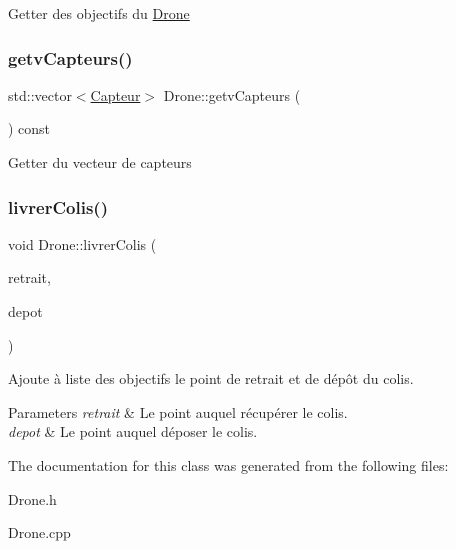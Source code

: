 Getter des objectifs du \mbox{\hyperlink{class_drone}{Drone}} \mbox{\label{class_drone_a584920a6f64ab0514f835354755af0ab}} 
\subsubsection{\texorpdfstring{getv\+Capteurs()}{getvCapteurs()}}
{\footnotesize\ttfamily std\+::vector$<$\mbox{\hyperlink{class_capteur}{Capteur}}$>$ Drone\+::getv\+Capteurs (\begin{DoxyParamCaption}{ }\end{DoxyParamCaption}) const}

Getter du vecteur de capteurs \mbox{\label{class_drone_ae7249a3f0c054e2c1beb6ea522774029}} 
\subsubsection{\texorpdfstring{livrer\+Colis()}{livrerColis()}}
{\footnotesize\ttfamily void Drone\+::livrer\+Colis (\begin{DoxyParamCaption}\item[{const \mbox{\hyperlink{class_vecteur_r3}{Vecteur\+R3}} \&}]{retrait,  }\item[{const \mbox{\hyperlink{class_vecteur_r3}{Vecteur\+R3}} \&}]{depot }\end{DoxyParamCaption})}

Ajoute à liste des objectifs le point de retrait et de dépôt du colis. 
\begin{DoxyParams}{Parameters}
{\em retrait} & Le point auquel récupérer le colis. \\
\hline
{\em depot} & Le point auquel déposer le colis. \\
\hline
\end{DoxyParams}


The documentation for this class was generated from the following files\+:\begin{DoxyCompactItemize}
\item 
Drone.\+h\item 
Drone.\+cpp\end{DoxyCompactItemize}
